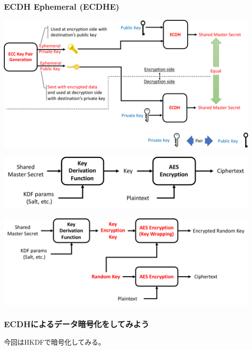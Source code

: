 \documentclass[12pt,dvipdfmx]{beamer}
\begin{document}
\begin{frame}
\frametitle{ECDH Ephemeral (ECDHE)}
\begin{center}
\includegraphics[width=\linewidth]{Figs/ecdh01.pdf}
\end{center}
\end{frame}

\begin{frame}
\begin{center}
\includegraphics[width=\linewidth]{Figs/ecdh02.pdf}
\end{center}
\end{frame}


\begin{frame}
\begin{center}
\includegraphics[width=\linewidth]{Figs/aeskw.pdf}
\end{center}
\end{frame}

\begin{frame}
\frametitle{ECDHによるデータ暗号化をしてみよう}
今回はHKDFで暗号化してみる。
\end{frame}
\end{document}
